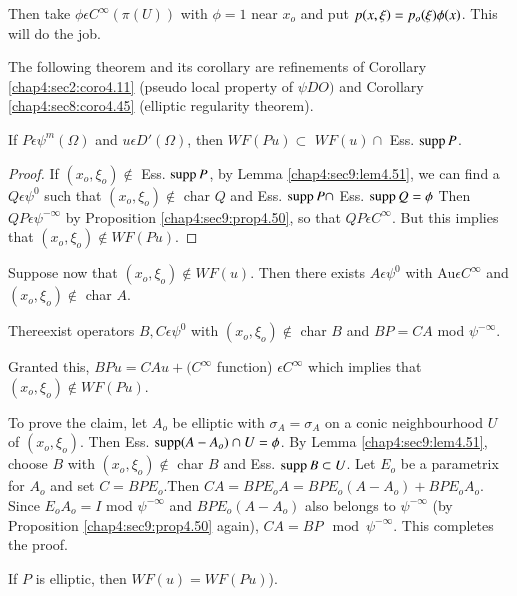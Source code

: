 Then take $\phi \epsilon C^{\infty}(\pi (U))$ with $\phi =1$ near
$x_o$ and put $p(x, \xi) =p_o (\xi)\break \phi (x)$. This will do the job. 

The following theorem and its corollary are refinements of Corollary
\ref{chap4:sec2:coro4.11} (pseudo local property of $\psi D O)$ and Corollary
\ref{chap4:sec8:coro4.45} (elliptic regularity theorem). 

\setcounter{thm}{51}
\begin{thm}\label{chap4:sec9:thm4.52}%
  If $P \epsilon \psi^m (\Omega) $ and $u \epsilon
  D'(\Omega)$, then $WF(Pu) \subset$ $WF (u) \cap$ Ess. $\operatorname{supp} P$. 
\end{thm}

\begin{proof}
  If $(x_o, \xi_o) \notin$ Ess. $\operatorname{supp} P$, by Lemma
  \ref{chap4:sec9:lem4.51}, we can find 
  a $Q \epsilon \psi^0$ such that $(x_o, \xi_o) \notin$ char $Q$ and
  Ess. $\operatorname{supp} P \cap$ Ess. $\operatorname{supp} Q = \phi $ Then $QP \epsilon
  \psi^{-\infty}$ by Proposition \ref{chap4:sec9:prop4.50}, so that $QP \epsilon
  C^{\infty}$. But this implies that $(x_o, \xi_o) \notin WF(Pu)$. 
\end{proof}

Suppose now that $(x_o, \xi_o) \notin WF(u)$. Then there exists $A
\epsilon \psi^0$ with Au$\epsilon C^{\infty}$ and $(x_o, \xi_o)
\notin$ char $A$. 

\begin{claim}
  There\pageoriginale exist operators $B,C \epsilon \psi^0$ with
  $(x_o, \xi_o) \notin$ 
  char $B$ and $BP = CA$ mod $\psi^{-\infty}$.  
\end{claim}

Granted this, $BPu =CAu + ( C^{\infty}$ function) $\epsilon
C^{\infty}$ which implies that $(x_o, \xi_o) \notin  WF(Pu)$. 

To prove the claim, let $A_o$ be elliptic with $\sigma_A = \sigma_A$
on a conic neighbourhood $U$ of $(x_o,  \xi_{o})$. Then Ess. $\operatorname{supp}
(A-A_{o}) \cap U = \phi$. By Lemma \ref{chap4:sec9:lem4.51}, choose $B$ with $(x_o, 
\xi_{o}) \notin $ char $B$ and Ess. $\operatorname{supp} B \subset U$. Let $E_o$ be
a parametrix for $A_o$ and set $C = BPE_o$.Then $CA = BPE_o A = BPE_o
(A -A_o)+ BPE_oA_o$. Since $E_o A_o = I$ mod $\psi^{-\infty}$ and
$BPE_o (A -A_o)$ also belongs to $\psi^{-\infty}$ (by Proposition
\ref{chap4:sec9:prop4.50} again), $CA = BP \mod \psi^{-\infty}$. This
completes the proof.
 
\setcounter{coro}{52}
\begin{coro}\label{chap4:sec9:coro4.53}%
  If $P$ is elliptic, then $WF(u) = WF(Pu)$).
\end{coro}

